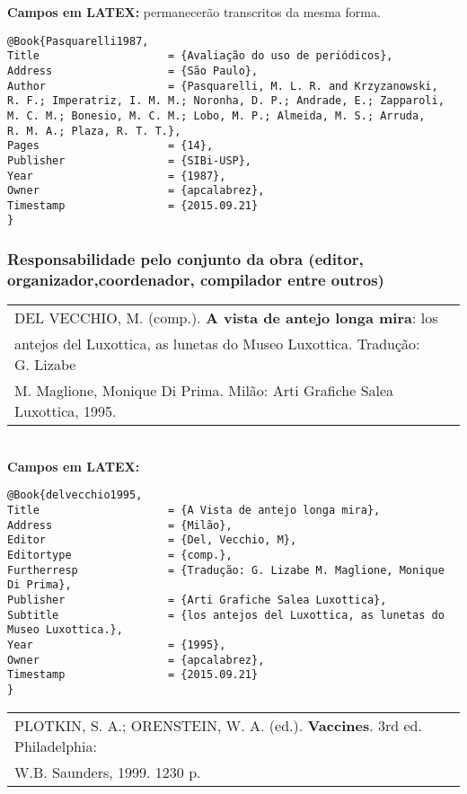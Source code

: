 \textbf{Campos em LATEX:} permanecerão transcritos da mesma forma.\\

\begin{verbatim}
@Book{Pasquarelli1987,
Title                    = {Avaliação do uso de periódicos},
Address                  = {São Paulo},
Author                   = {Pasquarelli, M. L. R. and Krzyzanowski,
R. F.; Imperatriz, I. M. M.; Noronha, D. P.; Andrade, E.; Zapparoli,
M. C. M.; Bonesio, M. C. M.; Lobo, M. P.; Almeida, M. S.; Arruda, 
R. M. A.; Plaza, R. T. T.},
Pages                    = {14},
Publisher                = {SIBi-USP},
Year                     = {1987},
Owner                    = {apcalabrez},
Timestamp                = {2015.09.21}
}
\end{verbatim}


\subsubsection{Responsabilidade pelo conjunto da obra (editor, organizador,coordenador, compilador entre outros)}

\begin{tabular}{|l|c|} \hline
	DEL VECCHIO, M. (comp.). \textbf{A vista de antejo longa mira}: los \\antejos
	del  Luxottica, as lunetas do Museo Luxottica. Tradução: G. Lizabe \\M. Maglione,  Monique Di Prima. Milão: Arti Grafiche Salea Luxottica, 1995.  \\\hline
\end{tabular}\\

\textbf{Campos em LATEX:}

\begin{verbatim}
@Book{delvecchio1995,
Title                    = {A Vista de antejo longa mira},
Address                  = {Milão},
Editor                   = {Del, Vecchio, M},
Editortype               = {comp.},
Furtherresp              = {Tradução: G. Lizabe M. Maglione, Monique 
Di Prima},
Publisher                = {Arti Grafiche Salea Luxottica},
Subtitle                 = {los antejos del Luxottica, as lunetas do 
Museo Luxottica.},
Year                     = {1995},
Owner                    = {apcalabrez},
Timestamp                = {2015.09.21}
}
\end{verbatim}

\begin{tabular}{|l|c|} \hline
	PLOTKIN, S. A.; ORENSTEIN, W. A. (ed.). \textbf{Vaccines}. 3rd ed. Philadelphia: \\ W.B. Saunders, 1999. 1230 p.  \\\hline
\end{tabular}\\

